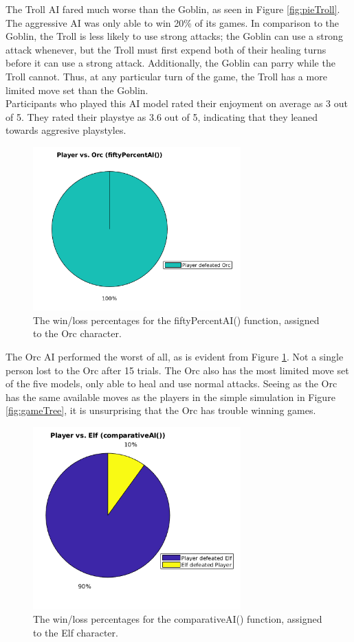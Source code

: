 The Troll AI fared much worse than the Goblin, as seen in Figure \ref{fig:pieTroll}. The aggressive AI was only able to win 20\% of its games. In comparison to the Goblin, the Troll is less likely to use strong attacks; the Goblin can use a strong attack whenever, but the Troll must first expend both of their healing turns before it can use a strong attack. Additionally, the Goblin can parry while the Troll cannot. Thus, at any particular turn of the game, the Troll has a more limited move set than the Goblin.\\

Participants who played this AI model rated their enjoyment on average as 3 out of 5. They rated their playstye as 3.6 out of 5, indicating that they leaned towards aggresive playstyles.

\begin{figure}[H]
  \centering
  \includegraphics[width=8cm]{figures/orcWins.png}
  \caption{The win/loss percentages for the fiftyPercentAI() function, assigned to the Orc character.}
  \label{fig:pieOrc}
\end{figure}

The Orc AI performed the worst of all, as is evident from Figure \ref{fig:pieOrc}. Not a single person lost to the Orc after 15 trials. The Orc also has the most limited move set of the five models, only able to heal and use normal attacks. Seeing as the Orc has the same available moves as the players in the simple simulation in Figure \ref{fig:gameTree}, it is unsurprising that the Orc has trouble winning games.

\begin{figure}[H]
  \centering
  \includegraphics[width=8cm]{figures/elfWins.png}
  \caption{The win/loss percentages for the comparativeAI() function, assigned to the Elf character.}
  \label{fig:pieElf}
\end{figure}

